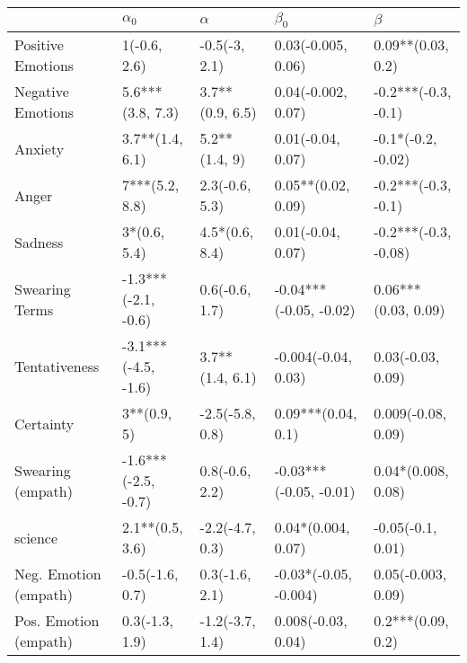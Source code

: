 \begin{tabular}{lllll}
\toprule
{} &           $\alpha_0$ &         $\alpha$ &               $\beta_0$ &               $\beta$ \\
\midrule
Positive Emotions     &         1(-0.6, 2.6) &    -0.5(-3, 2.1) &      0.03(-0.005, 0.06) &     0.09**(0.03, 0.2) \\
Negative Emotions     &     5.6***(3.8, 7.3) &  3.7**(0.9, 6.5) &      0.04(-0.002, 0.07) &   -0.2***(-0.3, -0.1) \\
Anxiety               &      3.7**(1.4, 6.1) &    5.2**(1.4, 9) &       0.01(-0.04, 0.07) &    -0.1*(-0.2, -0.02) \\
Anger                 &       7***(5.2, 8.8) &   2.3(-0.6, 5.3) &      0.05**(0.02, 0.09) &   -0.2***(-0.3, -0.1) \\
Sadness               &         3*(0.6, 5.4) &   4.5*(0.6, 8.4) &       0.01(-0.04, 0.07) &  -0.2***(-0.3, -0.08) \\
Swearing Terms        &  -1.3***(-2.1, -0.6) &   0.6(-0.6, 1.7) &  -0.04***(-0.05, -0.02) &   0.06***(0.03, 0.09) \\
Tentativeness         &  -3.1***(-4.5, -1.6) &  3.7**(1.4, 6.1) &     -0.004(-0.04, 0.03) &     0.03(-0.03, 0.09) \\
Certainty             &          3**(0.9, 5) &  -2.5(-5.8, 0.8) &      0.09***(0.04, 0.1) &    0.009(-0.08, 0.09) \\
Swearing (empath)     &  -1.6***(-2.5, -0.7) &   0.8(-0.6, 2.2) &  -0.03***(-0.05, -0.01) &    0.04*(0.008, 0.08) \\
science               &      2.1**(0.5, 3.6) &  -2.2(-4.7, 0.3) &      0.04*(0.004, 0.07) &     -0.05(-0.1, 0.01) \\
Neg. Emotion (empath) &      -0.5(-1.6, 0.7) &   0.3(-1.6, 2.1) &   -0.03*(-0.05, -0.004) &    0.05(-0.003, 0.09) \\
Pos. Emotion (empath) &       0.3(-1.3, 1.9) &  -1.2(-3.7, 1.4) &      0.008(-0.03, 0.04) &     0.2***(0.09, 0.2) \\
\bottomrule
\end{tabular}
